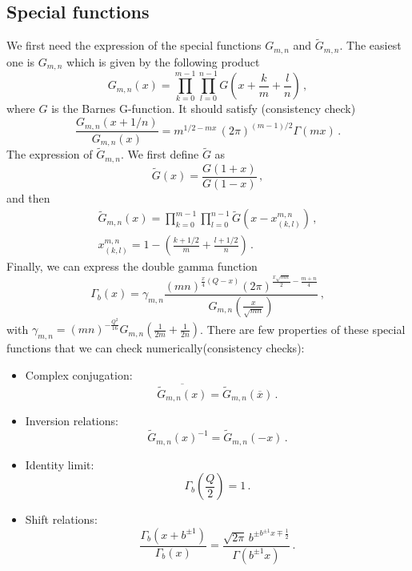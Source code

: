 \documentclass[11pt]{article}
\begin{document}
\subsection{Special functions}
We first need the expression of the special functions $G_{m,n}$ and $\tilde{G}_{m,n}$. The easiest one is $G_{m,n}$ which is given by the following product
\begin{equation}\label{eq:Gmn}
    G_{m,n}(x)=\prod_{k=0}^{m-1}\prod_{l=0}^{n-1}G\left(x+\frac{k}{m}+\frac{l}{n}\right)\,,
\end{equation}
where $G$ is the Barnes G-function. It should satisfy (consistency check)
\begin{equation}\label{eq:CheckGmn}
    \frac{G_{m,n}(x+1/n)}{G_{m,n}(x)}=m^{1/2 - m x}\,(2\pi)^{(m-1)/2}\Gamma(m x)\,.
\end{equation}
The expression of $\tilde{G}_{m,n}$. We first define $\tilde{G}$ as 
\begin{equation}\label{eq:Gtilde}
    \tilde{G}(x)=\frac{G(1+x)}{G(1-x)}\,,
\end{equation}
and then 
\begin{equation}\label{eq:Gtildemn}
    \begin{aligned}
        \tilde{G}_{m,n}(x)=\prod_{k=0}^{m-1}\prod_{l=0}^{n-1}\tilde{G}\left(x-x_{(k,l)}^{m,n}\right)\,,\\
        x_{(k,l)}^{m,n}=1-\left(\frac{k+1/2}{m}+\frac{l+1/2}{n}\right)\,.
    \end{aligned}
\end{equation}
Finally, we can express the double gamma function 
\begin{equation}
   \Gamma_b(x)=\gamma_{m,n}\frac{(mn)^{\frac{x}{4}(Q-x)}(2\pi)^{\frac{x\sqrt{mn}}{2}-\frac{m+n}{4}}}{G_{m,n}(\frac{x}{\sqrt{mn}})}\,,
\end{equation}
with $\gamma_{m,n}=(mn)^{-\frac{Q^2}{16}}G_{m,n}\left(\frac{1}{2m}+\frac{1}{2n}\right)$. There are few properties of these special functions that we can check numerically(consistency checks):
\begin{itemize}[leftmargin=*]
    \item Complex conjugation:
    \begin{equation}\label{eq:ComplexConjugation}
        \overline{\tilde{G}_{m,n}(x)}=\tilde{G}_{m,n}(\overline{x})\,.
    \end{equation}
    \item Inversion relations:
    \begin{equation}\label{eq:InversionRelations}
        \tilde{G}_{m,n}(x)^{-1}=\tilde{G}_{m,n}(-x)\,.
    \end{equation}
    \item Identity limit:
    \begin{equation}
        \Gamma_b\left(\frac{Q}{2}\right)=1\,.
    \end{equation}
    \item Shift relations:
    \begin{equation}
        \frac{\Gamma_b(x+b^{\pm 1})}{\Gamma_b(x)}=\frac{\sqrt{2\pi}\,b^{\pm b^{\pm 1} x \mp \frac{1}{2}}}{\Gamma(b^{\pm 1} x)}\,.
    \end{equation}
    
\end{itemize}
\end{document}
